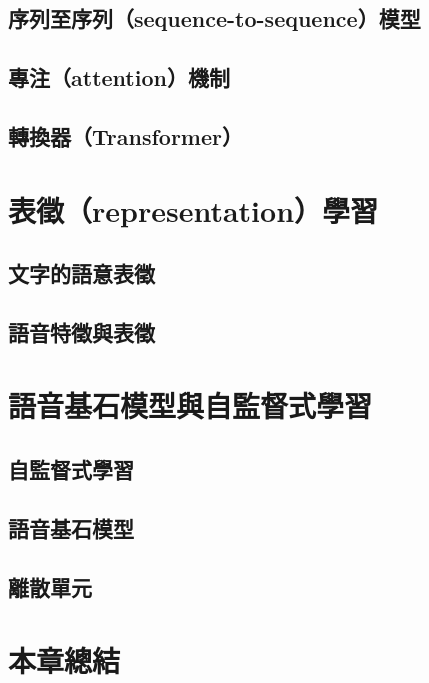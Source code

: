 
\subsection{
    序列至序列（sequence-to-sequence）模型}

\subsection{專注（attention）機制}    

\subsection{轉換器（Transformer）}


\section{表徵（representation）學習}

\subsection{文字的語意表徵}

\subsection{語音特徵與表徵}


\section{語音基石模型與自監督式學習}

\subsection{自監督式學習}

\subsection{語音基石模型}

\subsection{離散單元}


\section{本章總結}


